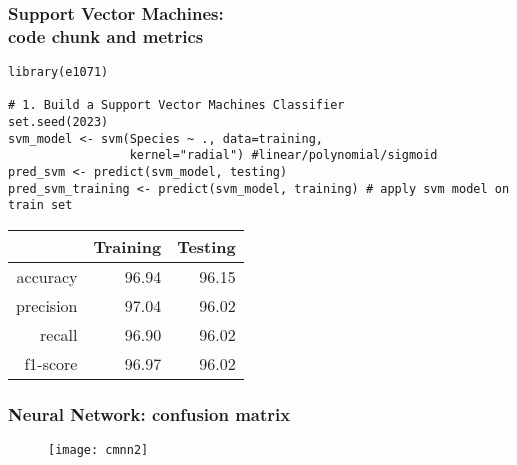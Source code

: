 \documentclass[border=5mm, convert, usenames, dvipsnames,beamer]{standalone}
\begin{document}
\begin{frame}[ fragile]{}
\frametitle{Support Vector Machines: \\ code chunk and metrics}

\vspace{30}
\noindent


\begin{lstlisting}[style=R]
library(e1071)

# 1. Build a Support Vector Machines Classifier
set.seed(2023)
svm_model <- svm(Species ~ ., data=training,
                 kernel="radial") #linear/polynomial/sigmoid
pred_svm <- predict(svm_model, testing)
pred_svm_training <- predict(svm_model, training) # apply svm model on train set
\end{lstlisting}


\begin{table}[ht]
\centering
\begin{tabular}{rrr}
  \hline
 & Training & Testing \\ 
  \hline
accuracy & 96.94 & 96.15 \\ 
  precision & 97.04 & 96.02 \\ 
  recall & 96.90 & 96.02 \\ 
  f1-score & 96.97 & 96.02 \\ 
   \hline
\end{tabular}
\end{table}


\end{frame}




\begin{frame}[ fragile]{}
\frametitle{Neural Network: confusion matrix}

\vspace{40}
\noindent

\vspace{-5mm}
\begin{figure}[h!]
\begin{center}
\texttt{[image: cmnn2]}
\end{center}
\end{figure}




\end{frame}
\end{document}
